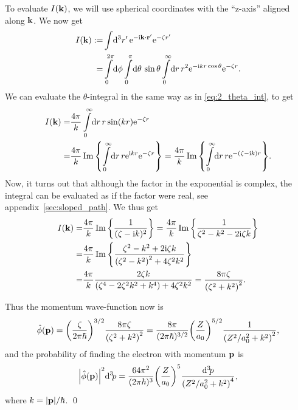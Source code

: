\documentclass[11pt,letter, swedish, english
]{article}
\begin{document}
To evaluate $I(\vb{k})$, we will use spherical coordinates with the
``z-axis'' aligned along $\vb{k}$. We now get
\begin{equation}
\begin{aligned}
I(\vk):=&\int\!\rd^3r'\,\ee^{-\ii\vk\vdot\vb{r}'} \ee^{-\zeta r'}\\
=&\int_0^{2\pi}\!\rd\phi\int_0^\pi\!\rd\theta\,\sin\theta
\int_0^\infty\!\rd{r}\,r^2\ee^{-\ii kr\cos\theta}\ee^{-\zeta r}.
\end{aligned}
\end{equation}
We can evaluate the $\theta$-integral in the same way as in
\eqref{eq:2_theta_int}, to get
\begin{equation}\label{eq:3_sloped_path}
\begin{aligned}
I(\vk)=&\frac{4\pi}{k}
\int_0^\infty\!\rd{r}\,r\sin(kr)\ee^{-\zeta r}\\
=&\frac{4\pi}{k}\Im\qty{
\int_0^\infty\!\rd{r}\,r\ee^{\ii kr}\ee^{-\zeta r}
} =\frac{4\pi}{k}\Im\qty{
\int_0^\infty\!\rd{r}\,r\ee^{-(\zeta-\ii k) r}
}.
\end{aligned}
\end{equation}
Now, it turns out that although the factor in the exponential is
complex, the integral can be evaluated as if the factor were real, see
appendix~\ref{sec:sloped_path}. We thus get
\begin{equation}
\begin{aligned}
I(\vb{k})=&\frac{4\pi}{k}
\Im\qty{\frac{1}{(\zeta-\mathrm{i}k)^2}}
=\frac{4\pi}{k}
\Im\qty{\frac{1}{\zeta^2-k^2 -2\mathrm{i}\zeta k}}\\
=&\frac{4\pi}{k}
\Im\qty{\frac{\zeta^2-k^2 +2\mathrm{i}\zeta k}
{\qty(\zeta^2-k^2)^2 +4\zeta^2k^2}}\\
=&\frac{4\pi}{k}
\frac{2\zeta k}
{\qty(\zeta^4-2\zeta^2k^2+k^4) +4\zeta^2k^2}
=\frac{8\pi\zeta}{\qty(\zeta^2+k^2)^2}.
\end{aligned}
\end{equation}

Thus the momentum wave-function now is
\begin{equation}
\hat{\phi}(\vb{p})=\qty(\frac{\zeta}{2\pi\hbar})^{3/2}
\frac{8\pi\zeta}{\qty(\zeta^2+k^2)^2}
=\frac{8\pi}{(2\pi\hbar)^{3/2}}\qty(\frac{Z}{a_0})^{5/2}
\frac{1}{\qty(Z^2/a_0^2+k^2)^2},
\end{equation}
and the probability of finding the electron with momentum $\vb{p}$ is
\begin{equation}
\abs{\hat{\phi}(\vb{p})}^2\mathrm{d}^3\!p=
\frac{64\pi^2}{(2\pi\hbar)^{3}}\qty(\frac{Z}{a_0})^{5}
\frac{\mathrm{d}^3\!p}{\qty(Z^2/a_0^2+k^2)^4},
\end{equation}
where $k=\abs{\vb{p}}/\hbar$.
\qed
\end{document}
